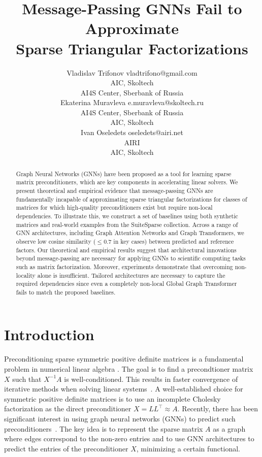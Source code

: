 \documentclass[10pt]{article} %
\title{Message-Passing GNNs Fail to Approximate \\ Sparse Triangular Factorizations}
\author{\name Vladislav Trifonov \email vladtrifono@gmail.com \\
      \addr AIC, Skoltech \\
      AI4S Center, Sberbank of Russia \\
      \AND
      \name Ekaterina Muravleva \email e.muravleva@skoltech.ru\\
      \addr AI4S Center, Sberbank of Russia \\
      AIC, Skoltech \\
      \AND
      \name Ivan Oseledets \email oseledets@airi.net \\
      \addr AIRI \\
      AIC, Skoltech}
\theoremstyle{plain}
\theoremstyle{definition}
\theoremstyle{remark}
\begin{document}
\maketitle

\begin{abstract}
Graph Neural Networks (GNNs) have been proposed as a tool for learning sparse matrix preconditioners, which are key components in accelerating linear solvers. We present theoretical and empirical evidence that message-passing GNNs are fundamentally incapable of approximating sparse triangular factorizations for classes of matrices for which high-quality preconditioners exist but require non-local dependencies. To illustrate this, we construct a set of baselines using both synthetic matrices and real-world examples from the SuiteSparse collection. Across a range of GNN architectures, including Graph Attention Networks and Graph Transformers, we observe low cosine similarity ($\leq0.7$ in key cases) between predicted and reference factors. Our theoretical and empirical results suggest that architectural innovations beyond message-passing are necessary for applying GNNs to scientific computing tasks such as matrix factorization. Moreover, experiments demonstrate that overcoming non-locality alone is insufficient. Tailored architectures are necessary to capture the required dependencies since even a completely non-local Global Graph Transformer fails to match the proposed baselines.
\end{abstract}

\section{Introduction} \label{Introduction}
Preconditioning sparse symmetric positive definite matrices is a fundamental problem in numerical linear algebra \citep{benzi2002preconditioning}.
The goal is to find a precondtioner matrix $X$ such that $X^{-1}A$ is well-conditioned. This results in faster convergence of iterative methods when solving linear systems~\citep{saad2003iterative}. A well-established choice for symmetric positive definite matrices is to use an incomplete Cholesky factorization as the direct preconditioner $X = LL^\top \approx A$. Recently, there has been significant interest in using graph neural networks (GNNs) to predict such preconditioners~\citep{li2024generative,trifonov2024learning,hausner2023neural, hausner2024learning}. The key idea is to represent the sparse matrix $A$ as a graph where edges correspond to the non-zero entries and to use GNN architectures to predict the entries of the preconditioner $X$, minimizing a certain functional.
\end{document}
